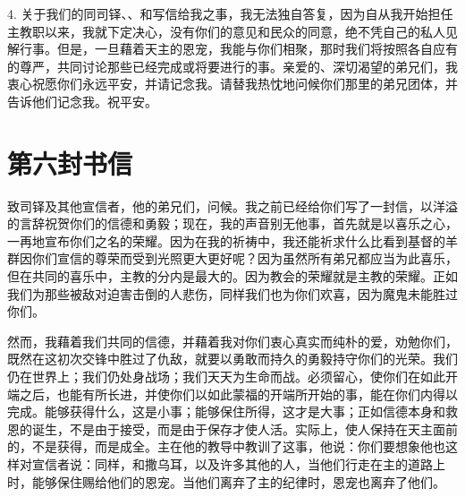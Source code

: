 4. 关于我们的同司铎、、和写信给我之事，我无法独自答复，因为自从我开始担任主教职以来，我就下定决心，没有你们的意见和民众的同意，绝不凭自己的私人见解行事。但是，一旦藉着天主的恩宠，我能与你们相聚，那时我们将按照各自应有的尊严，共同讨论那些已经完成或将要进行的事。亲爱的、深切渴望的弟兄们，我衷心祝愿你们永远平安，并请记念我。请替我热忱地问候你们那里的弟兄团体，并告诉他们记念我。祝平安。\par



\section{第六封书信}

\par

\par

致司铎及其他宣信者，他的弟兄们，问候。我之前已经给你们写了一封信，以洋溢的言辞祝贺你们的信德和勇毅；现在，我的声音别无他事，首先就是以喜乐之心，一再地宣布你们之名的荣耀。因为在我的祈祷中，我还能祈求什么比看到基督的羊群因你们宣信的尊荣而受到光照更大更好呢？因为虽然所有弟兄都应当为此喜乐，但在共同的喜乐中，主教的分内是最大的。因为教会的荣耀就是主教的荣耀。正如我们为那些被敌对迫害击倒的人悲伤，同样我们也为你们欢喜，因为魔鬼未能胜过你们。\par

然而，我藉着我们共同的信德，并藉着我对你们衷心真实而纯朴的爱，劝勉你们，既然在这初次交锋中胜过了仇敌，就要以勇敢而持久的勇毅持守你们的光荣。我们仍在世界上；我们仍处身战场；我们天天为生命而战。必须留心，使你们在如此开端之后，也能有所长进，并使你们以如此蒙福的开端所开始的事，能在你们内得以完成。能够获得什么，这是小事；能够保住所得，这才是大事；正如信德本身和救恩的诞生，不是由于接受，而是由于保存才使人活。实际上，使人保持在天主面前的，不是获得，而是成全。主在他的教导中教训了这事，他说：你们要想象他也这样对宣信者说：同样，和撒乌耳，以及许多其他的人，当他们行走在主的道路上时，能够保住赐给他们的恩宠。当他们离弃了主的纪律时，恩宠也离弃了他们。\par

